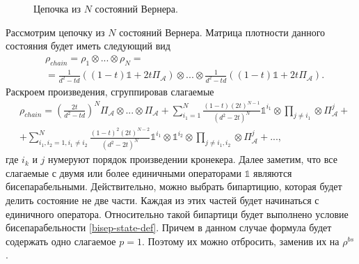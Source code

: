 \begin{figure}[h]
\caption{Цепочка из $N$ состояний Вернера.}
\label{img:werner-chain}
\end{figure}
Рассмотрим цепочку из $N$ состояний Вернера.
Матрица плотности данного состояния будет иметь следующий вид
\begin{equation}
\begin{split}
& \rho_{chain} = \rho_1 \otimes ... \otimes \rho_N = \\
& = \frac{1}{d^2 - td}
((1 - t) \mathbb{1} + 2t\Pi_{\mathcal A})
\otimes ... \otimes 
\frac{1}{d^2 - td}
((1 - t) \mathbb{1} + 2t\Pi_{\mathcal A}).
\end{split}
\end{equation}
Раскроем произведения, сгруппировав слагаемые
\begin{equation}
\begin{split}
& \rho_{chain} = 
\left(\frac{2t}{d^2 - td}\right)^N \Pi_{\mathcal A} \otimes ... \otimes \Pi_{\mathcal A}
+
\sum\limits_{i_1 = 1}^{N} \frac{(1-t)(2t)^{N-1}}{(d^2 - 2t)^N} \mathbb{1}^{i_1} \otimes \prod_{j \neq i_1} \otimes \Pi_{\mathcal A}^{j} + \\
&
+\sum\limits_{i_1, i_2 = 1, i_1 \neq i_2}^{N} \frac{(1-t)^2(2t)^{N-2}}{(d^2 - 2t)^N} \mathbb{1}^{i_1} \otimes \mathbb{1}^{i_2} \otimes \prod_{j \neq i_1,i_2} \otimes \Pi_{\mathcal A}^{j}  + ...,
\end{split}
\end{equation}
где $i_k$ и $j$ нумеруют порядок произведении кронекера. Далее заметим, что все слагаемые с двумя или более единичными операторами $\mathbb{1}$ являются бисепарабельными.
Действительно, можно выбрать бипартицию, которая будет делить состояние не две части.
Каждая из этих частей будет начинаться с единичного оператора.
Относительно такой бипартици будет выполнено условие бисепарабельности \ref{bisep-state-def}.
Причем в данном случае формула будет содержать одно слагаемое $p=1$.
Поэтому их можно отбросить, заменив их на $\rho^{bs}$.


